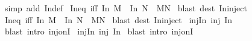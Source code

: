 \begin{isabellebody}
%
\isadelimproof
%
\endisadelimproof
%
\isatagproof
{}\isamarkupfalse%
\ {\isacharparenleft}simp\ add{\isacharcolon}\ In{}{\isacharunderscore}def{\isacharparenright}%
\endisatagproof
{\isafoldproof}%
%
\isadelimproof
\isanewline
%
\endisadelimproof
\isanewline
{}\isamarkupfalse%
\ In{}{\isacharunderscore}eq\ {\isacharbrackleft}iff{\isacharbrackright}{\isacharcolon}\ {\isachardoublequoteopen}{\isacharparenleft}In{}\ M\ {\isacharequal}\ In{}\ N{\isacharparenright}\ {\isacharequal}\ {\isacharparenleft}M{\isacharequal}N{\isacharparenright}{\isachardoublequoteclose}\isanewline
%
\isadelimproof
%
\endisadelimproof
%
\isatagproof
{}\isamarkupfalse%
\ {\isacharparenleft}blast\ dest{\isacharbang}{\isacharcolon}\ In{}{\isacharunderscore}inject{\isacharparenright}%
\endisatagproof
{\isafoldproof}%
%
\isadelimproof
\isanewline
%
\endisadelimproof
\isanewline
{}\isamarkupfalse%
\ In{}{\isacharunderscore}eq\ {\isacharbrackleft}iff{\isacharbrackright}{\isacharcolon}\ {\isachardoublequoteopen}{\isacharparenleft}In{}\ M\ {\isacharequal}\ In{}\ N{\isacharparenright}\ {\isacharequal}\ {\isacharparenleft}M{\isacharequal}N{\isacharparenright}{\isachardoublequoteclose}\isanewline
%
\isadelimproof
%
\endisadelimproof
%
\isatagproof
{}\isamarkupfalse%
\ {\isacharparenleft}blast\ dest{\isacharbang}{\isacharcolon}\ In{}{\isacharunderscore}inject{\isacharparenright}%
\endisatagproof
{\isafoldproof}%
%
\isadelimproof
\isanewline
%
\endisadelimproof
\isanewline
{}\isamarkupfalse%
\ inj{\isacharunderscore}In{}{\isacharcolon}\ {\isachardoublequoteopen}inj\ In{}{\isachardoublequoteclose}\isanewline
%
\isadelimproof
%
\endisadelimproof
%
\isatagproof
{}\isamarkupfalse%
\ {\isacharparenleft}blast\ intro{\isacharbang}{\isacharcolon}\ inj{\isacharunderscore}onI{\isacharparenright}%
\endisatagproof
{\isafoldproof}%
%
\isadelimproof
\isanewline
%
\endisadelimproof
\isanewline
{}\isamarkupfalse%
\ inj{\isacharunderscore}In{}{\isacharcolon}\ {\isachardoublequoteopen}inj\ In{}{\isachardoublequoteclose}\isanewline
%
\isadelimproof
%
\endisadelimproof
%
\isatagproof
{}\isamarkupfalse%
\ {\isacharparenleft}blast\ intro{\isacharbang}{\isacharcolon}\ inj{\isacharunderscore}onI{\isacharparenright}%
\endisatagproof
{\isafoldproof}%
%
\isadelimproof
\isanewline
%
\endisadelimproof
\isanewline
\isanewline
\isanewline
\isanewline

\end{isabellebody}
